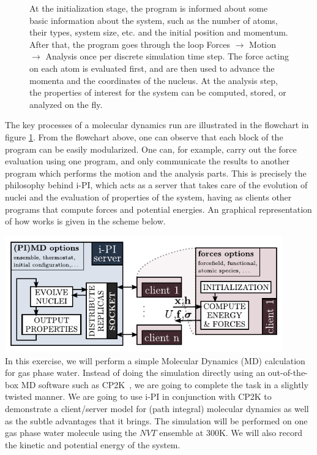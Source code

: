 \documentclass{article}
\begin{document}
\begin{Exercise}[label={i-pi},title={Molecular Dynamics: a client/server approach}]
\begin{figure}[h]
\begin{center}
    \end{center}
    \caption{At the initialization stage, the program is informed about some basic information about the system, such as the number of atoms, their types, system size, etc. and the initial position and momentum. After that, the program goes through the loop Forces $\rightarrow$ Motion $\rightarrow$ Analysis once per discrete simulation time step. The force acting on each atom is evaluated first, and are then used to advance the momenta and the coordinates of the nucleus. At the analysis step, the properties of interest for the system can be computed, stored, or analyzed on the fly.
    \label{fig:MD_flow}}
\end{figure}

The key processes of a molecular dynamics run are illustrated in the flowchart in figure \ref{fig:MD_flow}. From the flowchart above, one can observe that each block of the program can be easily modularized.
One can, for example, carry out the force evaluation using one program, and only communicate the results to another program which performs the motion and the analysis parts. This is precisely the philosophy behind i-PI, which acts as a server that takes care of the evolution of nuclei and the evaluation of properties of the system, having as clients other programs that compute forces and potential energies. An graphical representation of how \ipi{} works is given in the scheme below.

{\centering\includegraphics[width=0.9\textwidth]{ipi-scheme.pdf}} \\



In this exercise, we will perform a simple Molecular Dynamics (MD) calculation for gas phase water. Instead of doing the simulation directly using an out-of-the-box MD software such as CP2K~\cite{citeCP2K}, we are going to complete the task in a slightly twisted manner. We are going to use i-PI in conjunction with CP2K to demonstrate a client/server model for (path integral) molecular dynamics as well as the subtle advantages that it brings. The simulation will be performed on one gas phase water molecule using the $NVT$ ensemble at 300K. We will also record the kinetic and potential energy of the system.


\end{Exercise}
\end{document}
